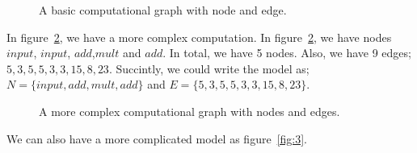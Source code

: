 \documentclass[vecarrow]{svproc}
\begin{document}
\begin{figure} 
\caption{A basic computational graph with node and edge.}
\label{fig:1} 
\end{figure} 

In figure~\ref{fig:2}, we have a more complex computation. In figure~\ref{fig:2}, we have nodes $input$, $input$, 
$add$,$mult$ and $add$. In total, we have 5 nodes. Also, we have 9 edges; $5,3,5,5,3,3,15,8,23$. Succintly, we could write the model as; $ N=\{input, add,mult, add\}$ and $E=\{5,3,5,5,3,3,15,8,23\}$.

\begin{figure} 
\caption{A more complex computational graph with nodes and edges.}
\label{fig:2} 
\end{figure} 

We can also have a more complicated model as figure~\ref{fig:3}.
\end{document}
